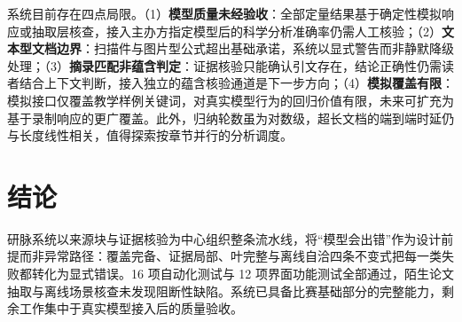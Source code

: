 \documentclass[11pt]{article}
\begin{document}
系统目前存在四点局限。（1）\textbf{模型质量未经验收}：全部定量结果基于确定性模拟响应或抽取层核查，接入主办方指定模型后的科学分析准确率仍需人工核验；（2）\textbf{文本型文档边界}：扫描件与图片型公式超出基础承诺，系统以显式警告而非静默降级处理；（3）\textbf{摘录匹配非蕴含判定}：证据核验只能确认引文存在，结论正确性仍需读者结合上下文判断，接入独立的蕴含核验通道是下一步方向；（4）\textbf{模拟覆盖有限}：模拟接口仅覆盖教学样例关键词，对真实模型行为的回归价值有限，未来可扩充为基于录制响应的更广覆盖。此外，归纳轮数虽为对数级，超长文档的端到端时延仍与长度线性相关，值得探索按章节并行的分析调度。

\section{结论}

研脉系统以来源块与证据核验为中心组织整条流水线，将“模型会出错”作为设计前提而非异常路径：覆盖完备、证据局部、叶完整与离线自洽四条不变式把每一类失败都转化为显式错误。16 项自动化测试与 12 项界面功能测试全部通过，陌生论文抽取与离线场景核查未发现阻断性缺陷。系统已具备比赛基础部分的完整能力，剩余工作集中于真实模型接入后的质量验收。


\end{document}
